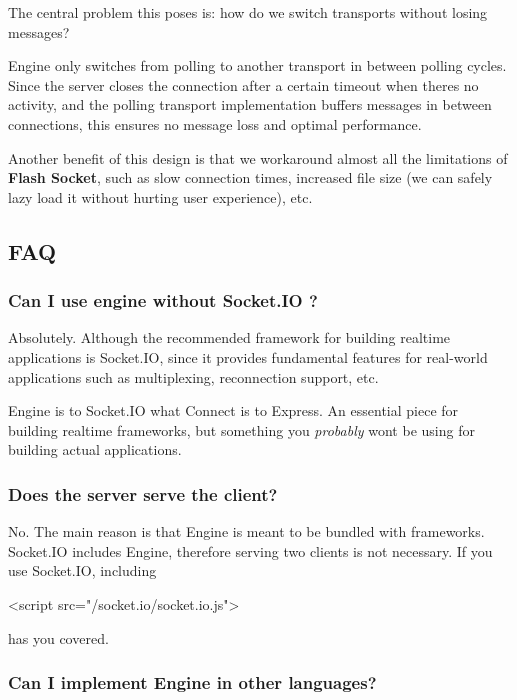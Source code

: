 The central problem this poses is\+: how do we switch transports without losing messages?

{\ttfamily Engine} only switches from polling to another transport in between polling cycles. Since the server closes the connection after a certain timeout when there\textquotesingle{}s no activity, and the polling transport implementation buffers messages in between connections, this ensures no message loss and optimal performance.

Another benefit of this design is that we workaround almost all the limitations of {\bfseries Flash Socket}, such as slow connection times, increased file size (we can safely lazy load it without hurting user experience), etc.

\subsection*{F\+AQ}

\subsubsection*{Can I use engine without Socket.\+IO ?}

Absolutely. Although the recommended framework for building realtime applications is Socket.\+IO, since it provides fundamental features for real-\/world applications such as multiplexing, reconnection support, etc.

{\ttfamily Engine} is to Socket.\+IO what Connect is to Express. An essential piece for building realtime frameworks, but something you {\itshape probably} won\textquotesingle{}t be using for building actual applications.

\subsubsection*{Does the server serve the client?}

No. The main reason is that {\ttfamily Engine} is meant to be bundled with frameworks. Socket.\+IO includes {\ttfamily Engine}, therefore serving two clients is not necessary. If you use Socket.\+IO, including


\begin{DoxyCode}
<script src="/socket.io/socket.io.js">
\end{DoxyCode}


has you covered.

\subsubsection*{Can I implement {\ttfamily Engine} in other languages?}

